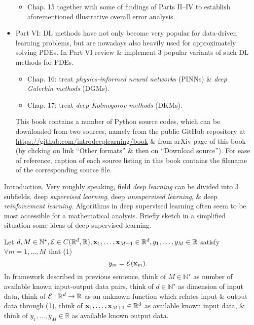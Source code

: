 \documentclass{article}
\begin{document}
\begin{itemize}
\begin{itemize}
		\item Chap. 15 together with some of findings of Parts II--IV to establish aforementioned illustrative overall error analysis.
	\end{itemize}
	\item Part VI: DL methods have not only become very popular for data-driven learning problems, but are nowadays also heavily used for approximately solving PDEs. In Part VI review \& implement 3 popular variants of such DL methods for PDEs.
	\begin{itemize}
		\item Chap. 16: treat {\it physics-informed neural networks} (PINNs) \& {\it deep Galerkin methods} (DGMs).
		\item Chap. 17: treat {\it deep Kolmogorov methods} (DKMs).
	\end{itemize}
	This book contains a number of Python source codes, which can be downloaded from two sources, namely from the public GitHub repository at \url{https://github.com/introdeeplearning/book} \& from arXiv page of this book (by clicking on link ``Other formats'' \& then on ``Download source''). For ease of reference, caption of each source listing in this book contains the filename of the corresponding source file.
\end{itemize}

{\sf Introduction.} Very roughly speaking, field {\it deep learning} can be divided into 3 subfields, deep {\it supervised learning}, deep {\it unsupervised learning}, \& deep {\it reinforcement learning}. Algorithms in deep supervised learning often seem to be most accessible for a mathematical analysis. Briefly sketch in a simplified situation some ideas of deep supervised learning.

Let $d,M\in\mathbb{N}^\star,{\cal E}\in C(\mathbb{R}^d,\mathbb{R}),{\bf x}_1,\ldots,{\bf x}_{M+1}\in\mathbb{R}^d,y_1,\ldots,y_M\in\mathbb{R}$ satisfy $\forall m = 1,\ldots,M$ that (1)
\begin{equation}
	y_m = {\cal E}({\bf x}_m).
\end{equation}
In framework described in previous sentence, think of $M\in\mathbb{N}^\star$ as number of available known input-output data pairs, think of $d\in\mathbb{N}^\star$ as dimension of input data, think of ${\cal E}:\mathbb{R}^d\to\mathbb{R}$ as an unknown function which relates input \& output data through (1), think of ${\bf x}_1,\ldots,{\bf x}_{M+1}\in\mathbb{R}^d$ as available known input data, \& think of $y_1,\ldots,y_M\in\mathbb{R}$ as available known output data.
\end{document}
